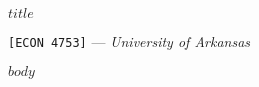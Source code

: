 \documentclass[12pt]{article}
\begin{document}
\begin{center}
  {\Huge\bf $title$}
  
  \smallskip
  {\large\texttt{[ECON 4753]} — \textit{University of Arkansas}}

\end{center}

$body$
\end{document}
